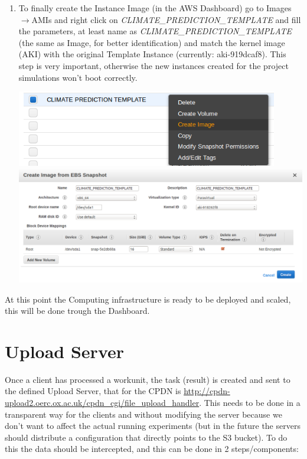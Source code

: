\documentclass[journal abbreviation, manuscript]{copernicus}
\begin{document}
\begin{enumerate}
\item To finally create the Instance Image (in the AWS Dashboard) go to Ima\-ges$\rightarrow$AMIs and right click on \textit{CLIMATE\_PREDIC\-TION\_TEMPLATE}
 and fill the parameters, at least name as \textit{CLIMATE\_PREDICTION\_TEMPLATE} (the same as Image, for better identification) and match the kernel image (AKI) with the original
 Template Instance (currently: aki-919dcaf8). This step is very important, otherwise the new instances created for the project simulations
 won't boot correctly.
\begin{center}
  \includegraphics[width=4.5in]{images/screenshots/image_creation/03.png}\\
  \includegraphics[width=6.5in]{images/screenshots/image_creation/04.png}
\end{center}
\end{enumerate}

At this point the Computing infrastructure is ready to be deployed and scaled, this will be done trough the Dashboard.


\section{Upload Server}

Once a client has processed a workunit, the task (result) is created and sent to the defined Upload Server, that for the CPDN is \url{http://cpdn-upload2.oerc.ox.ac.uk/cpdn_cgi/file_upload_handler}. This needs to be done in a transparent way for the clients and without modifying the server because we don't want to affect the actual running experiments (but in the future the servers should distribute a configuration that directly points to the S3 bucket). To do this the data should be intercepted, and this can be done in 2 steps/components:
\end{document}
